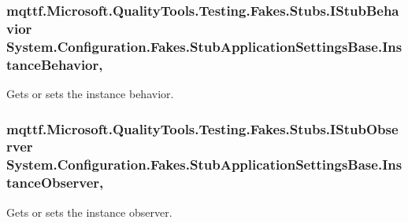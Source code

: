 \hypertarget{class_system_1_1_configuration_1_1_fakes_1_1_stub_application_settings_base_ab0a73be310eec7ddf2258b377d6982c9}{
\subsubsection[{Instance\-Behavior}]{\setlength{\rightskip}{0pt plus 5cm}mqttf.\-Microsoft.\-Quality\-Tools.\-Testing.\-Fakes.\-Stubs.\-I\-Stub\-Behavior System.\-Configuration.\-Fakes.\-Stub\-Application\-Settings\-Base.\-Instance\-Behavior\hspace{0.3cm}{\ttfamily [get]}, {\ttfamily [set]}}}\label{class_system_1_1_configuration_1_1_fakes_1_1_stub_application_settings_base_ab0a73be310eec7ddf2258b377d6982c9}


Gets or sets the instance behavior.

\hypertarget{class_system_1_1_configuration_1_1_fakes_1_1_stub_application_settings_base_a13a5d99456d412a0e4703ef3f03e4524}{
\subsubsection[{Instance\-Observer}]{\setlength{\rightskip}{0pt plus 5cm}mqttf.\-Microsoft.\-Quality\-Tools.\-Testing.\-Fakes.\-Stubs.\-I\-Stub\-Observer System.\-Configuration.\-Fakes.\-Stub\-Application\-Settings\-Base.\-Instance\-Observer\hspace{0.3cm}{\ttfamily [get]}, {\ttfamily [set]}}}\label{class_system_1_1_configuration_1_1_fakes_1_1_stub_application_settings_base_a13a5d99456d412a0e4703ef3f03e4524}


Gets or sets the instance observer.

